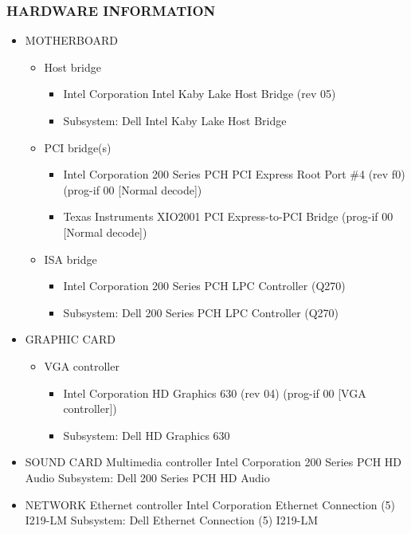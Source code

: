 \documentclass[a4paper]{report}
\begin{document}
\subsubsection{HARDWARE INFORMATION}
\begin{itemize}
\item MOTHERBOARD
\begin{itemize} 
\item Host bridge
\begin{itemize}
\item Intel Corporation Intel Kaby Lake Host Bridge (rev 05)
\item Subsystem: Dell Intel Kaby Lake Host Bridge
\end{itemize}
\item
PCI bridge(s)
\begin{itemize}
\item Intel Corporation 200 Series PCH PCI Express Root Port \#4 (rev f0) (prog-if 00 [Normal decode])
\item Texas Instruments XIO2001 PCI Express-to-PCI Bridge (prog-if 00 [Normal decode])
\end{itemize}
\item ISA bridge
\begin{itemize}
\item Intel Corporation 200 Series PCH LPC Controller (Q270)
\item Subsystem: Dell 200 Series PCH LPC Controller (Q270)
\end{itemize}
\end{itemize}
\item GRAPHIC CARD
\begin{itemize}
\item VGA controller
\begin{itemize}
\item Intel Corporation HD Graphics 630 (rev 04) (prog-if 00 [VGA controller])
\item Subsystem: Dell HD Graphics 630
\end{itemize}
\end{itemize}
	
\item SOUND CARD
	Multimedia controller
		Intel Corporation 200 Series PCH HD Audio
		Subsystem: Dell 200 Series PCH HD Audio
\item NETWORK
	Ethernet controller
		Intel Corporation Ethernet Connection (5) I219-LM
		Subsystem: Dell Ethernet Connection (5) I219-LM
\end{itemize}
\end{document}
